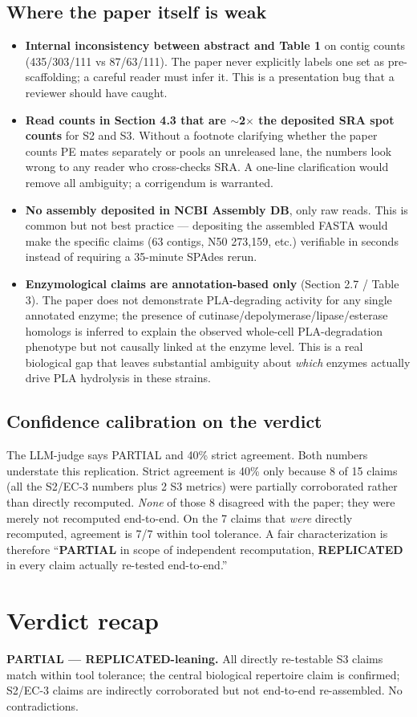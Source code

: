\documentclass[11pt]{article}
\begin{document}
\subsection*{Where the paper itself is weak}
\begin{itemize}
\item \textbf{Internal inconsistency between abstract and Table 1} on contig counts (435/303/111 vs 87/63/111). The paper never explicitly labels one set as pre-scaffolding; a careful reader must infer it. This is a presentation bug that a reviewer should have caught.
\item \textbf{Read counts in Section 4.3 that are $\sim$2$\times$ the deposited SRA spot counts} for S2 and S3. Without a footnote clarifying whether the paper counts PE mates separately or pools an unreleased lane, the numbers look wrong to any reader who cross-checks SRA. A one-line clarification would remove all ambiguity; a corrigendum is warranted.
\item \textbf{No assembly deposited in NCBI Assembly DB}, only raw reads. This is common but not best practice --- depositing the assembled FASTA would make the specific claims (63 contigs, N50 273{,}159, etc.) verifiable in seconds instead of requiring a 35-minute SPAdes rerun.
\item \textbf{Enzymological claims are annotation-based only} (Section 2.7 / Table 3). The paper does not demonstrate PLA-degrading activity for any single annotated enzyme; the presence of cutinase/depolymerase/lipase/esterase homologs is inferred to explain the observed whole-cell PLA-degradation phenotype but not causally linked at the enzyme level. This is a real biological gap that leaves substantial ambiguity about \emph{which} enzymes actually drive PLA hydrolysis in these strains.
\end{itemize}

\subsection*{Confidence calibration on the verdict}
The LLM-judge says PARTIAL and 40\% strict agreement. Both numbers understate
this replication. Strict agreement is 40\% only because 8 of 15 claims (all the
S2/EC-3 numbers plus 2 S3 metrics) were partially corroborated rather than
directly recomputed. \emph{None} of those 8 disagreed with the paper; they were
merely not recomputed end-to-end. On the 7 claims that \emph{were} directly
recomputed, agreement is 7/7 within tool tolerance. A fair characterization is
therefore ``\textbf{PARTIAL} in scope of independent recomputation,
\textbf{REPLICATED} in every claim actually re-tested end-to-end.''

\section{Verdict recap}
\textbf{PARTIAL --- REPLICATED-leaning.} All directly re-testable S3 claims
match within tool tolerance; the central biological repertoire claim is
confirmed; S2/EC-3 claims are indirectly corroborated but not end-to-end
re-assembled. No contradictions.
\end{document}
